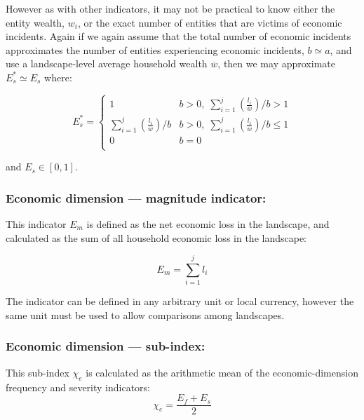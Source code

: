 \documentclass[fleqn,10pt]{olplainarticle}
\begin{document}
However as with other indicators, it may not be practical to know either the entity wealth, $w_i$, or the exact number of entities that are victims of economic incidents. Again if we again assume  that the total number of economic incidents approximates the number of entities experiencing economic incidents, $b \simeq a$, and use a landscape-level average household wealth $\overline{w}$, then we may approximate $E_s^\ast \simeq E_s$ where:

\begin{equation*}
    E_s^\ast = \begin{cases}
    1                   & b > 0,\; \sum_{i=1}^{j}(\frac{l_i}{\overline{w}})/b > 1\\
    \sum_{i=1}^{j}(\frac{l_i}{\overline{w}})/b & b > 0,\; \sum_{i=1}^{j}(\frac{l_i}{\overline{w}})/b \le 1 \\
    0                   & b = 0 \\
    \end{cases}
\end{equation*}

and $E_s \in [0,1]$.\\

\subsubsection*{Economic dimension --- magnitude indicator:}

This indicator $E_m$ is defined as the net economic loss in the landscape, and calculated as the sum of all household economic loss in the landscape:

\begin{equation*}
    E_m = \sum_{i=1}^{j}l_i
\end{equation*}

The indicator can be defined in any arbitrary unit or local currency, however the same unit must be used to allow comparisons among landscapes.

\subsubsection*{Economic dimension --- sub-index:}

This sub-index $\chi_e$ is calculated as the arithmetic mean of  the economic-dimension frequency and severity indicators:
\begin{equation*}
    \chi_e = \frac{E_f + E_s}{2}
\end{equation*}
\end{document}
